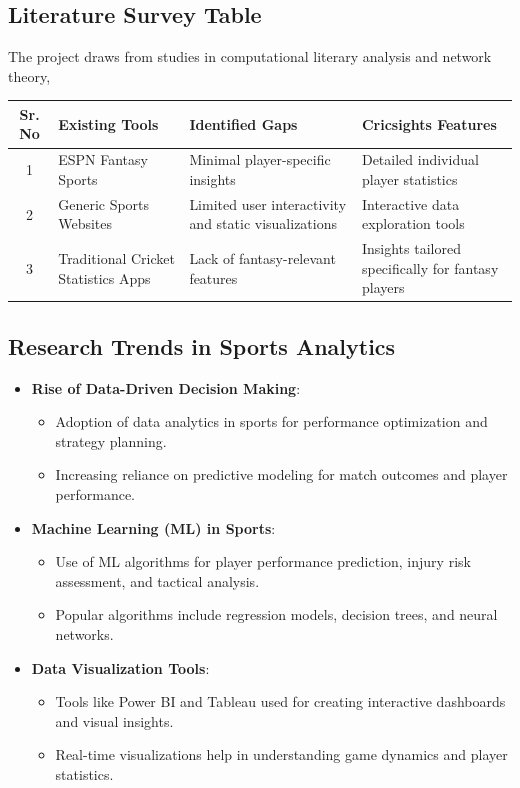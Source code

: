 \subsection{Literature Survey Table}
The project draws from studies in computational literary analysis and network theory, 
\begin{longtable}{|c|p{4cm}|p{6cm}|p{5cm}|}
    \hline
    \textbf{Sr. No} & \textbf{Existing Tools} & \textbf{Identified Gaps} & \textbf{Cricsights Features} \\ \hline
    1 & ESPN Fantasy Sports
     & Minimal player-specific insights & Detailed individual player statistics \\ \hline
    2 & Generic Sports Websites  & Limited user interactivity and static visualizations & Interactive data exploration tools \\ \hline
    3 & Traditional Cricket Statistics Apps  & Lack of fantasy-relevant features & Insights tailored specifically for fantasy players\\ \hline
   
\end{longtable}
\subsection{Research Trends in Sports Analytics}
\begin{itemize}
    \item \textbf{Rise of Data-Driven Decision Making}:
    \begin{itemize}
        \item Adoption of data analytics in sports for performance optimization and strategy planning.
        \item Increasing reliance on predictive modeling for match outcomes and player performance.
    \end{itemize}
    \item \textbf{Machine Learning (ML) in Sports}:
    \begin{itemize}
        \item Use of ML algorithms for player performance prediction, injury risk assessment, and tactical analysis.
        \item Popular algorithms include regression models, decision trees, and neural networks.
    \end{itemize}
    \item \textbf{Data Visualization Tools}:
    \begin{itemize}
        \item Tools like Power BI and Tableau used for creating interactive dashboards and visual insights.
        \item Real-time visualizations help in understanding game dynamics and player statistics.
    \end{itemize}
\end{itemize}

